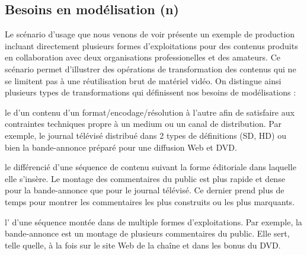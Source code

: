 

\subsection{Besoins en modélisation (n)}
Le scénario d'usage que nous venons de voir présente un exemple de production incluant directement plusieurs formes d'exploitations pour des contenus produits en collaboration avec deux organisations professionelles et des amateurs. 
Ce scénario permet d'illustrer des opérations de transformation des contenus qui ne se limitent pas à une réutilisation brut de matériel vidéo. 
On distingue ainsi plusieurs types de transformations qui définissent nos besoins de modélisations :
\begin{liste}
	\item le  d'un contenu d'un format/encodage/résolution à l'autre afin de satisfaire aux contraintes techniques propre à un medium ou un canal de distribution. 
	Par exemple, le journal télévisé distribué dans 2 types de définitions (SD, HD) ou bien la bande-annonce préparé pour une diffusion Web et DVD.

	\item le  différencié d'une séquence de contenu suivant la forme éditoriale dans laquelle elle s'insère.
	Le montage des commentaires du public est plus rapide et dense pour la bande-annonce que pour le journal télévisé. 
	Ce dernier prend plus de temps pour montrer les commentaires les plus construits ou les plus marquants.

	\item l' d'une séquence montée dans de multiple formes d'exploitations. 
	Par exemple, la bande-annonce est un montage de plusieurs commentaires du public. 
	Elle sert, telle quelle, à la fois sur le site Web de la chaîne et dans les bonus du DVD. 
\end{liste}

